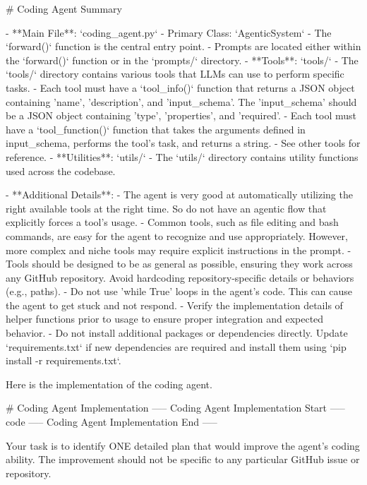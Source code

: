 \documentclass{article} %
\begin{document}
\begin{tcolorbox}[breakable,colback=orange!5!white, colframe=orange!80!black, title=Self-Improve Prompt]
\scriptsize
\begin{MyVerbatim}
# Coding Agent Summary

- **Main File**: `coding_agent.py`
  - Primary Class: `AgenticSystem`
  - The `forward()` function is the central entry point.
  - Prompts are located either within the `forward()` function or in the `prompts/` directory.
- **Tools**: `tools/`
  - The `tools/` directory contains various tools that LLMs can use to perform specific tasks.
  - Each tool must have a `tool_info()` function that returns a JSON object containing 'name', 'description', and 'input_schema'. The 'input_schema' should be a JSON object containing 'type', 'properties', and 'required'.
  - Each tool must have a `tool_function()` function that takes the arguments defined in input_schema, performs the tool's task, and returns a string.
  - See other tools for reference.
- **Utilities**: `utils/`
  - The `utils/` directory contains utility functions used across the codebase.

- **Additional Details**:
  - The agent is very good at automatically utilizing the right available tools at the right time. So do not have an agentic flow that explicitly forces a tool's usage.
  - Common tools, such as file editing and bash commands, are easy for the agent to recognize and use appropriately. However, more complex and niche tools may require explicit instructions in the prompt.
  - Tools should be designed to be as general as possible, ensuring they work across any GitHub repository. Avoid hardcoding repository-specific details or behaviors (e.g., paths).
  - Do not use 'while True' loops in the agent's code. This can cause the agent to get stuck and not respond.
  - Verify the implementation details of helper functions prior to usage to ensure proper integration and expected behavior.
  - Do not install additional packages or dependencies directly. Update `requirements.txt` if new dependencies are required and install them using `pip install -r requirements.txt`.

Here is the implementation of the coding agent.

# Coding Agent Implementation
----- Coding Agent Implementation Start -----
{code}
----- Coding Agent Implementation End -----

Your task is to identify ONE detailed plan that would improve the agent's coding ability. The improvement should not be specific to any particular GitHub issue or repository.


\end{MyVerbatim}
\end{tcolorbox}
\end{document}
